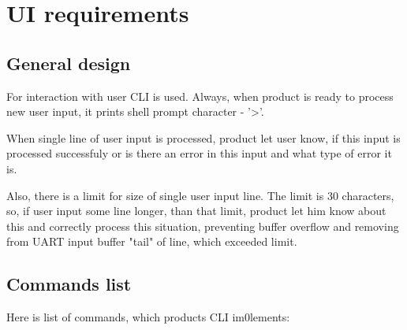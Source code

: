 \chapter*{UI requirements}

\section*{General design}

For interaction with user CLI is used. Always, when product is ready to process new user input, it prints shell prompt character - '>'.

When single line of user input is processed, product let user know, if this input is processed successfuly or is there an error in this input and what type of error it is.

Also, there is a limit for size of single user input line. The limit is 30 characters, so, if user input some line longer, than that limit, product let him know about this and correctly process this situation, preventing buffer overflow and removing from UART input buffer "tail" of line, which exceeded limit.

\section*{Commands list}

Here is list of commands, which products CLI im0lements:



